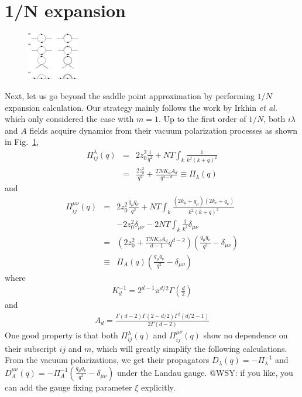 \documentclass[aps,twocolumn,superscriptaddress]{revtex4-1}
\newcommand{\bea}{\begin{eqnarray}}
\newcommand{\eea}{\end{eqnarray}}
\newcommand{\etal}{\textit{et al.{ }}}
\begin{document}
\section{1/N expansion}
\begin{figure}
  \includegraphics[width=0.2\textwidth]{self.eps}
  \caption{\label{fig:self}}
\end{figure}
Next, let us go beyond the saddle point approximation by performing $1/N$ expansion calculation. Our strategy mainly follows the work by Irkhin \etal \cite{irkhin1996} which only considered the case with $m=1$. Up to the first order of $1/N$, both $i\lambda$ and $A$ fields acquire dynamics from their vacuum polarization processes as shown in Fig.~\ref{fig:self},
\bea \Pi_{ij}^\lambda(q)&=&2z_0^2\frac{1}{q^2} + NT\int_k \frac{1}{k^2(k+q)^2} \nonumber\\ &=&\frac{2z_0^2}{q^2}+\frac{TNK_dA_d}{q^{4-d}} \equiv \Pi_\lambda(q) \eea 
and 
\bea \Pi_{ij}^{\mu\nu}(q) &=& 2z_0^2 \frac{q_\mu q_\nu}{q^2} + NT\int_k \frac{(2k_\mu+q_\mu)(2k_\nu+q_\nu)}{k^2(k+q)^2} \nonumber\\ && - 2z_0^2 \delta_{\mu\nu} -2NT\int_k \frac{1}{k^2}\delta_{\mu\nu}  \nonumber\\ &=&\left(2z_0^2+\frac{TNK_dA_d}{d-1} q^{d-2}\right)\left(\frac{q_\mu q_\nu}{q^2}-\delta_{\mu\nu}\right) \nonumber\\
&\equiv& \Pi_A(q)\left(\frac{q_\mu q_\nu}{q^2}-\delta_{\mu\nu}\right) \eea
where 
\bea K_d^{-1}=2^{d-1}\pi^{d/2}\Gamma\left(\frac{d}{2}\right) \eea
and
\bea A_d=\frac{\Gamma(d-2)\Gamma(2-d/2)\Gamma^2(d/2-1)}{2\Gamma(d-2)} \eea
One good property is that both $\Pi_{ij}^\lambda(q)$ and $\Pi_{ij}^{\mu\nu}(q)$ show no dependence on their subscript $ij$ and $m$, which will greatly simplify the following calculations. From the vacuum polarizations, we get their propagators $D_\lambda(q)=-\Pi_\lambda^{-1}$ and
$D_A^{\mu\nu}(q)=-\Pi_A^{-1}\left(\frac{q_\mu q_\nu}{q^2}-\delta_{\mu\nu}\right)$ under the Landau gauge. {\color{red} @WSY: if you like, you can add the gauge fixing parameter $\xi$ explicitly.}
\end{document}
